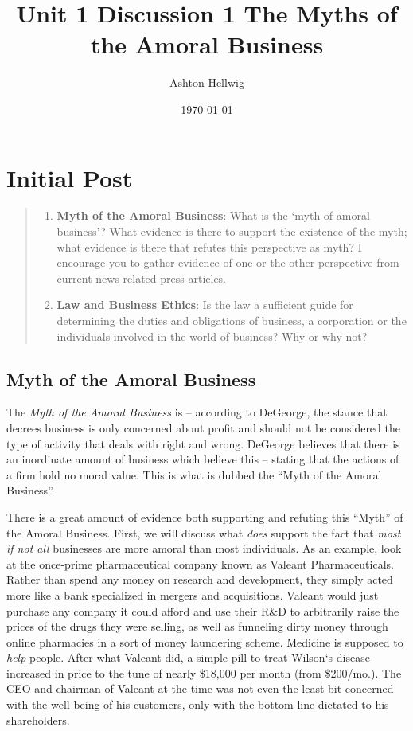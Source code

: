 \documentclass[12pt]{article}
\title{%
    Unit 1 Discussion 1%
    \large{The Myths of the Amoral Business}
  }
\author{Ashton Hellwig}
\date{\today}
\theoremstyle{definition}
\theoremstyle{plain}
\begin{document}
  \maketitle
  
  \section{Initial Post}
    \begin{quote}
      \begin{enumerate}
        \item \textbf{Myth of the Amoral Business}: What is the ‘myth of amoral business’? What evidence is
        there to support the existence of the myth; what evidence is there that refutes this perspective as
          myth? I encourage you to gather evidence of one or the other perspective from current news related press articles.
        \item \textbf{Law and Business Ethics}: Is the law a sufficient guide for determining the duties and
          obligations of business, a corporation or the individuals involved in the world of business? Why or
          why not?
      \end{enumerate}
    \end{quote}
  
    \subsection{Myth of the Amoral Business}
      The \textit{Myth of the Amoral Business} is -- according to DeGeorge, the stance that
        decrees business is only concerned about profit and should not be considered the
        type of activity that deals with right and wrong. DeGeorge believes that there is
        an inordinate amount of business which believe this -- stating that the actions
        of a firm hold no moral value. This is what is dubbed the ``Myth of the Amoral Business''.
        
      There is a great amount of evidence both supporting and refuting this ``Myth'' of the
        Amoral Business. First, we will discuss what \textit{does} support the fact that
        \textit{most if not all} businesses are more amoral than most individuals. As
        an example, look at the once-prime pharmaceutical company known as Valeant Pharmaceuticals.
        Rather than spend any money on research and development, they simply acted more like a
        bank specialized in mergers and acquisitions. Valeant would just purchase any company
        it could afford and use their R\&D to arbitrarily raise the prices of the drugs they
        were selling, as well as funneling dirty money through online pharmacies in a sort
        of money laundering scheme. Medicine is supposed to \textit{help} people. After
        what Valeant did, a simple pill to treat Wilson`s disease increased in price to the
        tune of nearly \$18,000 per month (from \$200/mo.). The CEO and chairman of Valeant at
        the time was not even the least bit concerned with the well being of his customers,
        only with the bottom line dictated to his shareholders.
        
\end{document}
